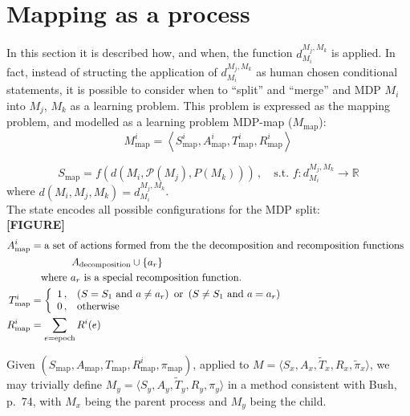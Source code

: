 \section{Mapping as a process}

In this section it is described how, and when, the function $d^{M_j, M_k}_{M_i}$ is applied. In fact, instead of structing the application of $d^{M_j, M_k}_{M_i}$ as human chosen conditional statements, it is possible to consider when to ``split'' and ``merge'' and MDP $M_i$ into $M_j$, $M_k$ as a learning problem. This problem is expressed as the mapping problem, and modelled as a learning problem MDP-map ($M_{\text{map}}$):
\begin{equation*}
M^i_{\text{map}} = \left\langle S^{i}_{\text{map}}, A^{i}_{\text{map}}, T^{i}_{\text{map}}, R^{i}_{\text{map}} \right\rangle
\end{equation*}

\begin{equation*}
S_{\text{map}} = f\left( d\left( M_i, \mathscr{P}\left( M_j \right), P\left( M_k \right) \right) \right)\,,\quad\text{s.t.\ }
f: d^{M_j, M_k}_{M_i} \to \mathbb{R} 
\end{equation*}
where $d\left( M_i, M_j, M_k \right) = d^{M_j, M_k}_{M_i}$.\\

The state encodes all possible configurations for the MDP split:\\
\textbf{[FIGURE]}\\
\begin{align*}
A^{i}_{\text{map}} & = 
\text{a set of actions formed from the the decomposition and recomposition functions\: } \\
& \qquad \qquad
A_{\text{decomposition}} \cup \left\{ a_r \right\} \\
& \quad
\text{where\ }a_r \text{\ is a special recomposition function.}\\
T^{i}_{\text{map}} & = \left\{ 
\begin{array}{cl} 1\,, & \left( S = S_1 \text{\ and\ } a \neq a_r \right) \text{\ or\ } \left( S \neq S_1 \text{\ and\ } a = a_r \right)  \\ 0\,, & \text{otherwise} \end{array} 
\right. \\
R^{i}_{\text{map}} & = \sum_{e=\text{epoch}}R^{i}(e) \\
\end{align*}



Given $(S_{\textrm{map}}, A_{\textrm{map}}, T_{\textrm{map}}, R^{i}_{\textrm{map}}, \pi_{\textrm{map}})$, applied to $M=\langle S_x, A_x, \tilde{T}_x, R_x, \tilde{\pi}_x \rangle$, we may trivially define $M_y=\langle S_y, A_y, \tilde{T}_y, R_y, \pi_y \rangle$ in a method consistent with Bush, p.\ 74, with $M_x$ being the parent process and $M_y$ being the child.\\

